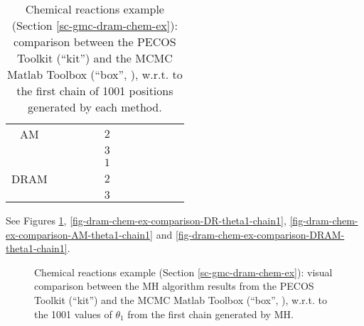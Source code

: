 \begin{table}[h!]
\begin{center}
\begin{tabular}{|c|c|c|c|c|c|c|c|c|c|c|c|}
\cline{6-12}
AM     &                &                  &               &                   & $2$ &                      &                        &                     &                       &                         &                          \\
\cline{6-12}
       &                &                  &               &                   & $3$ &                      &                        &                     &                       &                         &                          \\
\hline
       &                &                  &               &                   & $1$ &                      &                        &                     &                       &                         &                          \\
\cline{6-12}
DRAM   &                &                  &               &                   & $2$ &                      &                        &                     &                       &                         &                          \\
\cline{6-12}
       &                &                  &               &                   & $3$ &                      &                        &                     &                       &                         &                          \\
\hline
\end{tabular}
\caption{Chemical reactions example (Section \ref{sc-gmc-dram-chem-ex}):
comparison between the PECOS Toolkit (``kit'') and the MCMC Matlab Toolbox (``box'', \cite{mcmctool}), w.r.t. to the first chain of 1001 positions generated by each method.
}
\label{tab-dram-chem-ex-comparison}
\end{center}
\end{table}

See Figures
\ref{fig-dram-chem-ex-comparison-MH-theta1-chain1},
\ref{fig-dram-chem-ex-comparison-DR-theta1-chain1},
\ref{fig-dram-chem-ex-comparison-AM-theta1-chain1} and
\ref{fig-dram-chem-ex-comparison-DRAM-theta1-chain1}.

\begin{figure}[h!]
\begin{center}
\end{center}
\caption{Chemical reactions example (Section \ref{sc-gmc-dram-chem-ex}):
visual comparison between the MH algorithm results from the PECOS Toolkit (``kit'') and the MCMC Matlab Toolbox (``box'', \cite{mcmctool}), w.r.t. to the 1001 values of $\theta_1$ from the first chain generated by MH.
}
\label{fig-dram-chem-ex-comparison-MH-theta1-chain1}
\end{figure}

